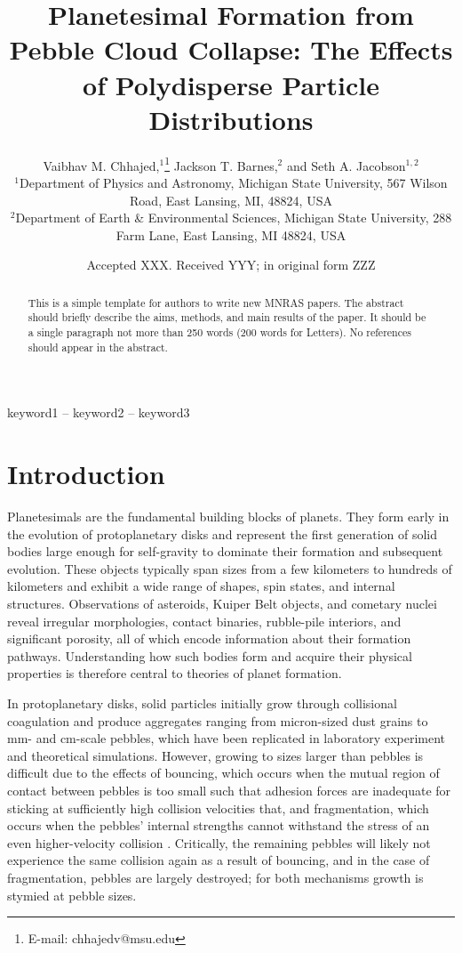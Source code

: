 \documentclass[fleqn,usenatbib]{mnras}
\title[The Effects of Polydisperse Particle Distributions]{Planetesimal Formation from Pebble Cloud Collapse: The Effects of Polydisperse Particle Distributions}
\author[V. M. Chhajed et al.]{
Vaibhav M. Chhajed,$^{1}$\thanks{E-mail: chhajedv@msu.edu}
Jackson T. Barnes,$^{2}$
and Seth A. Jacobson$^{1,2}$
\\
$^{1}$Department of Physics and Astronomy, Michigan State University, 567 Wilson Road, East Lansing, MI, 48824, USA\\
$^{2}$Department of Earth \& Environmental Sciences, Michigan State University, 288 Farm Lane, East Lansing, MI 48824, USA\\
}
\date{Accepted XXX. Received YYY; in original form ZZZ}
\begin{document}
\label{firstpage}
\pagerange{\pageref{firstpage}--\pageref{lastpage}}
\maketitle

\begin{abstract}
This is a simple template for authors to write new MNRAS papers.
The abstract should briefly describe the aims, methods, and main results of the paper.
It should be a single paragraph not more than 250 words (200 words for Letters).
No references should appear in the abstract.
\end{abstract}

\begin{keywords}
keyword1 -- keyword2 -- keyword3
\end{keywords}

\section{Introduction}\label{sec:Intro}

Planetesimals are the fundamental building blocks of planets. They form early in the evolution of protoplanetary disks and represent the first generation of solid bodies large enough for self-gravity to dominate their formation and subsequent evolution. 
These objects typically span sizes from a few kilometers to hundreds of kilometers and exhibit a wide range of shapes, spin states, and internal structures. 
Observations of asteroids, Kuiper Belt objects, and cometary nuclei reveal irregular morphologies, contact binaries, rubble-pile interiors, and significant porosity, all of which encode information about their formation pathways.
Understanding how such bodies form and acquire their physical properties is therefore central to theories of planet formation.

In protoplanetary disks, solid particles initially grow through collisional coagulation and produce aggregates ranging from micron-sized dust grains to mm- and cm-scale pebbles, which have been replicated in laboratory experiment and theoretical simulations.
However, growing to sizes larger than pebbles is difficult due to the effects of bouncing, which occurs when the mutual region of contact between pebbles is too small such that adhesion forces are inadequate for sticking at sufficiently high collision velocities that, and fragmentation, which occurs when the pebbles' internal strengths cannot withstand the stress of an even higher-velocity collision \citep[for a review of laboratory and theoretical simulation outcomes, see][]{Blum2018}.
Critically, the remaining pebbles will likely not experience the same collision again as a result of bouncing, and in the case of fragmentation, pebbles are largely destroyed; for both mechanisms growth is stymied at pebble sizes.
\end{document}
